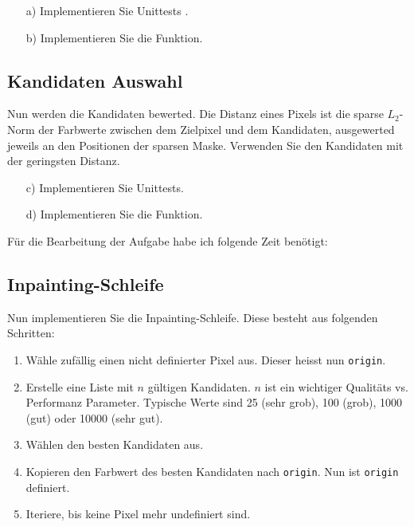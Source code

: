 \begin{enumerate}

\item[a)] Implementieren Sie Unittests . 

\item[b)] Implementieren Sie die Funktion.

\end{enumerate}

\subsection{Kandidaten Auswahl}

Nun werden die Kandidaten bewerted. Die Distanz eines Pixels ist die sparse $L_2$-Norm der Farbwerte zwischen dem Zielpixel und dem Kandidaten, ausgewerted jeweils an den Positionen der sparsen Maske. Verwenden Sie den Kandidaten mit der geringsten Distanz.

\begin{enumerate}

\item[c)] Implementieren Sie Unittests. 

\item[d)] Implementieren Sie die Funktion.

\end{enumerate}

Für die Bearbeitung der Aufgabe habe ich folgende Zeit benötigt:

\subsection{Inpainting-Schleife}

Nun implementieren Sie die Inpainting-Schleife. Diese besteht aus folgenden Schritten:

\begin{enumerate}

\item Wähle zufällig einen nicht definierter Pixel aus. Dieser heisst nun \texttt{origin}.
\item Erstelle eine Liste mit $n$ gültigen Kandidaten. $n$ ist ein wichtiger Qualitäts vs. Performanz Parameter. Typische Werte sind 25 (sehr grob), 100 (grob), 1000 (gut) oder 10000 (sehr gut). 
\item Wählen den besten Kandidaten aus.
\item Kopieren  den Farbwert des besten Kandidaten nach \texttt{origin}. Nun ist \texttt{origin} definiert.
\item Iteriere, bis keine Pixel mehr undefiniert sind. 

\end{enumerate}

